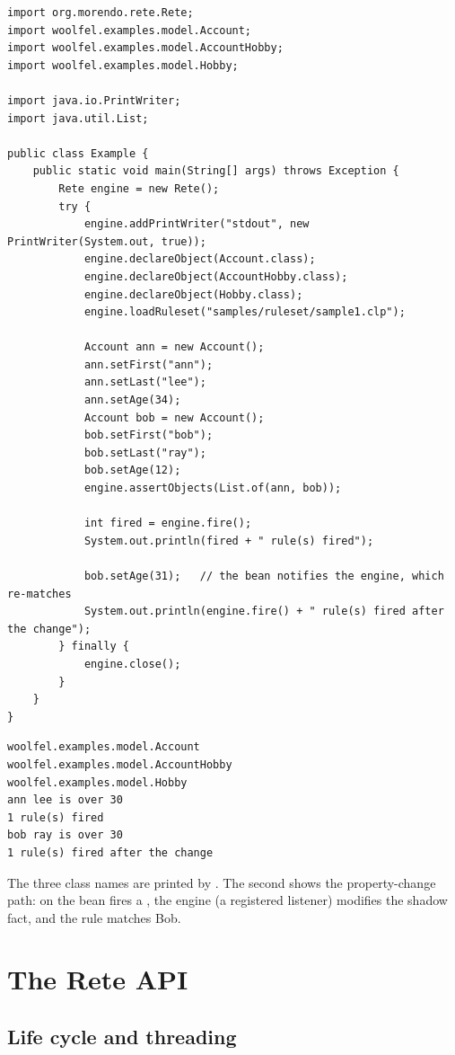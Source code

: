\begin{lstlisting}[style=java]
import org.morendo.rete.Rete;
import woolfel.examples.model.Account;
import woolfel.examples.model.AccountHobby;
import woolfel.examples.model.Hobby;

import java.io.PrintWriter;
import java.util.List;

public class Example {
    public static void main(String[] args) throws Exception {
        Rete engine = new Rete();
        try {
            engine.addPrintWriter("stdout", new PrintWriter(System.out, true));
            engine.declareObject(Account.class);
            engine.declareObject(AccountHobby.class);
            engine.declareObject(Hobby.class);
            engine.loadRuleset("samples/ruleset/sample1.clp");

            Account ann = new Account();
            ann.setFirst("ann");
            ann.setLast("lee");
            ann.setAge(34);
            Account bob = new Account();
            bob.setFirst("bob");
            bob.setLast("ray");
            bob.setAge(12);
            engine.assertObjects(List.of(ann, bob));

            int fired = engine.fire();
            System.out.println(fired + " rule(s) fired");

            bob.setAge(31);   // the bean notifies the engine, which re-matches
            System.out.println(engine.fire() + " rule(s) fired after the change");
        } finally {
            engine.close();
        }
    }
}
\end{lstlisting}

\begin{lstlisting}[style=shell]
woolfel.examples.model.Account
woolfel.examples.model.AccountHobby
woolfel.examples.model.Hobby
ann lee is over 30
1 rule(s) fired
bob ray is over 30
1 rule(s) fired after the change
\end{lstlisting}

The three class names are printed by . The second
 shows the property-change path:  on the
 bean fires a , the engine (a
registered listener) modifies the shadow fact, and the  rule
matches Bob.

\section{The Rete API}

\subsection{Life cycle and threading}

